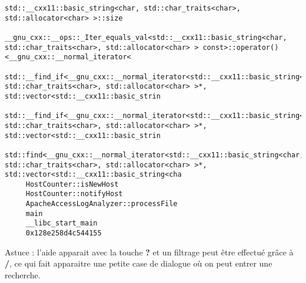 \begin{lstlisting}
std::__cxx11::basic_string<char, std::char_traits<char>, std::allocator<char> >::size                                                                              
     __gnu_cxx::__ops::_Iter_equals_val<std::__cxx11::basic_string<char, std::char_traits<char>, std::allocator<char> > const>::operator()<__gnu_cxx::__normal_iterator<
     std::__find_if<__gnu_cxx::__normal_iterator<std::__cxx11::basic_string<char, std::char_traits<char>, std::allocator<char> >*, std::vector<std::__cxx11::basic_strin
     std::__find_if<__gnu_cxx::__normal_iterator<std::__cxx11::basic_string<char, std::char_traits<char>, std::allocator<char> >*, std::vector<std::__cxx11::basic_strin
     std::find<__gnu_cxx::__normal_iterator<std::__cxx11::basic_string<char, std::char_traits<char>, std::allocator<char> >*, std::vector<std::__cxx11::basic_string<cha
     HostCounter::isNewHost                                                                                                                                             
     HostCounter::notifyHost                                                                                                                                            
     ApacheAccessLogAnalyzer::processFile                                                                                                                               
     main                                                                                                                                                               
     __libc_start_main                                                                                                                                                  
     0x128e258d4c544155 
\end{lstlisting}
Astuce : l'aide apparait avec la touche \textbf{?} et un filtrage peut être effectué grâce à \textbf{/}, ce qui fait apparaitre une petite case de dialogue où on peut entrer une recherche.

